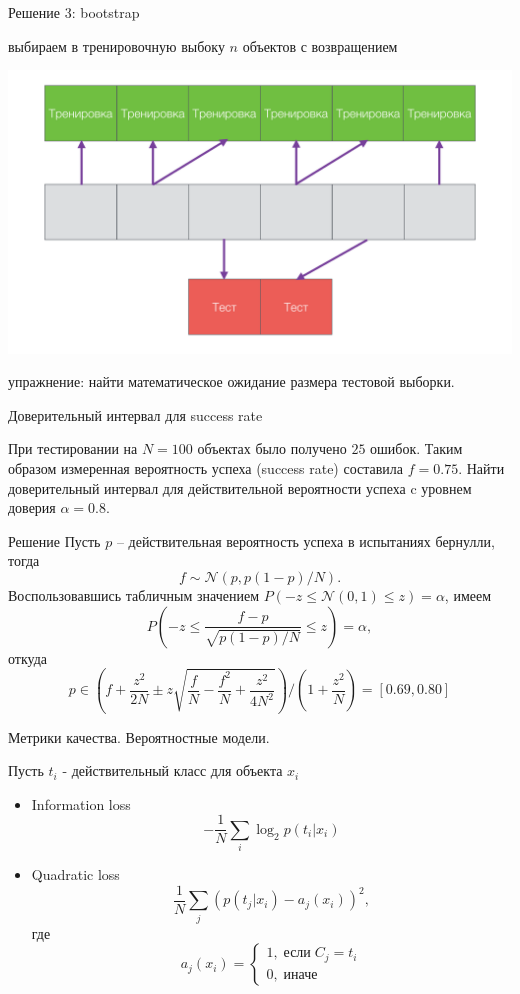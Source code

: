 \documentclass[10pt]{beamer}
\begin{document}
\begin{frame}{Решение 3: bootstrap}

выбираем в тренировочную выбоку $n$ объектов с возвращением

\begin{center}
\includegraphics[scale=0.15]{images/boot.png}
\end{center}

упражнение: найти математическое ожидание размера тестовой выборки.
  
\end{frame}

\begin{frame}{Доверительный интервал для success rate}

При тестировании на $N=100$ объектах было получено $25$ ошибок. Таким образом измеренная вероятность успеха (success rate) составила $f=0.75$. Найти доверительный интервал для действительной вероятности успеха c уровнем доверия $\alpha=0.8$. 

\begin{exampleblock}{Решение}
Пусть $p$ -- действительная вероятность успеха в испытаниях бернулли, тогда
\[
f \sim \mathcal{N}\left( p, p(1-p)/N \right).
\]
Воспользовавшись табличным значением $P(-z \leq \mathcal{N}(0,1) \leq z) = \alpha$, имеем
\[
P\left(-z \leq \frac{f-p}{\sqrt{p(1-p)/N}} \leq z \right) = \alpha,
\]
откуда
\[
p \in \left(f + \frac{z^2}{2N} \pm z \sqrt{\frac f N - \frac{f^2}{N}+\frac{z^2}{4N^2}} \right)/\left(1 + \frac {z^2}{N} \right) = [0.69, 0.80]
\]
\end{exampleblock}
  
\end{frame}

\begin{frame}{Метрики качества. Вероятностные модели.}

Пусть $t_i$ - действительный класс для объекта $x_i$
\begin{itemize}
\item  Information loss 
\[
- \frac 1 N \sum_i \log_2 p(t_i | x_i)
\]
\item Quadratic loss 
\[
\frac 1 N \sum_j (p(t_j | x_i) - a_j(x_i))^2,
\] 
где
\[
a_j(x_i) = \begin{cases}
1, \;\text{если}\;C_j = t_i\\
0, \;\text{иначе}
\end{cases} 
\]
\end{itemize}

\end{frame}
\end{document}
